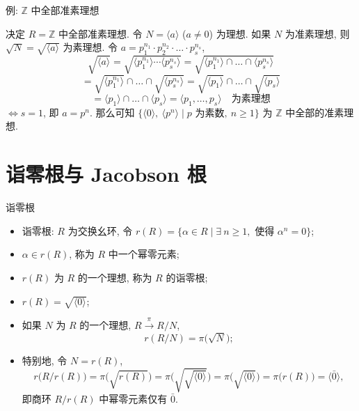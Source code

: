 \begin{frame}{例: $\mathbb{Z}$ 中全部准素理想}

\begin{eg}
决定 $R = \mathbb{Z}$ 中全部准素理想. 令 $N = \langle a \rangle$ ($a \neq 0$)
为理想. 如果 $N$ 为准素理想, 则 $\sqrt{N} = \sqrt{\langle a \rangle}$
为素理想. 令 $a = p_1^{n_1} \cdot p_2^{n_2} \cdot \dots \cdot p_s^{n_s}$,
\[
\sqrt{\langle a \rangle}
= \sqrt{\langle p_1^{n_1} \rangle \cdots \langle p_s^{n_s} \rangle}
= \sqrt{\langle p_1^{n_1} \rangle \cap \dots \cap \langle p_s^{n_s} \rangle}
\]
\[
= \sqrt{\langle p_1^{n_1} \rangle} \cap \dots \cap \sqrt{\langle p_s^{n_s} \rangle}
= \sqrt{\langle p_1 \rangle} \cap \dots \cap \sqrt{\langle p_s \rangle}
\]
\[
= \langle p_1 \rangle \cap \dots \cap \langle p_s \rangle
= \langle p_1, \dots, p_s \rangle
\quad \text{为素理想}
\]
\pause
$\iff s = 1$, 即 $a = p^n$. 那么可知
$\big\{ \langle 0 \rangle,\ \langle p^n \rangle \;\big|\; p \text{ 为素数},\
n \geqslant 1 \big\}$ 为 $\mathbb{Z}$ 中全部的准素理想.
\end{eg}

\end{frame}


\section[诣零根]{诣零根与 Jacobson 根}


\begin{frame}{诣零根}

\begin{itemize}
\item 诣零根: $R$ 为交换幺环, 令
  $r(R) = \{ \alpha \in R \mid \exists\ n \geqslant 1,$
  使得 $\alpha^n = 0 \}$;
\item $\alpha \in r(R)$, 称为 $R$ 中一个幂零元素;
\item $r(R)$ 为 $R$ 的一个理想, 称为 $R$ 的诣零根;
\item $r(R) = \sqrt{\langle 0 \rangle}$;
\item 如果 $N$ 为 $R$ 的一个理想, $R \xrightarrow{\ \pi\ } R/N$,
  \[
  r(R/N) = \pi \big( \sqrt{N} \big) ;
  \]
\item 特别地, 令 $N = r(R)$,
  \[
  r \big( R / r(R) \big)
  = \pi \big( \sqrt{r(R)} \big)
  = \pi \big( \sqrt{\sqrt{\langle 0 \rangle}} \big)
  = \pi \big( \sqrt{\langle 0 \rangle} \big)
  = \pi \big( r(R) \big)
  = \langle \bar{0} \rangle ,
  \]
  即商环 $R / r(R)$ 中幂零元素仅有 $\bar{0}$.
\end{itemize}

\end{frame}

